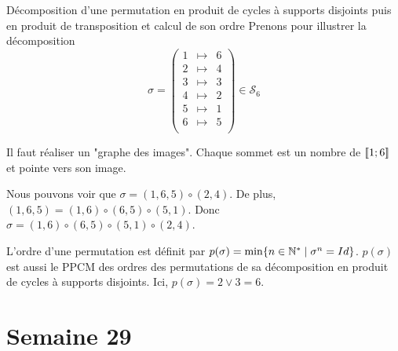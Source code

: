 \documentclass{article}
\renewenvironment{question_kholle}[2][ ]
{
	\subsection{\texorpdfstring{#2}{}}
	\notblank{#1}
	{
		\noindent #1
		\bigbreak
	}
	{}
	\begin{proof}
}
{
	\end{proof}
}
\begin{document}
\begin{question_kholle}
  {Décomposition d'une permutation en produit de cycles à supports disjoints puis en produit de transposition et calcul de son ordre}
  Prenons pour illustrer la décomposition
  \begin{equation*}
    \sigma = \begin{pmatrix}
      1 & \mapsto & 6 \\
      2 & \mapsto & 4 \\
      3 & \mapsto & 3 \\
      4 & \mapsto & 2 \\
      5 & \mapsto & 1 \\
      6 & \mapsto & 5 \\
    \end{pmatrix}
    \in \mathcal{S}_6
  \end{equation*}

  Il faut réaliser un "graphe des images". Chaque sommet est un nombre de $[\![ 1; 6 ]\!]$ et pointe vers son image.

  \begin{figure}[H]
    \centering
  \end{figure}

  Nous pouvons voir que $\sigma = (1, 6, 5) \circ (2, 4)$.
  De plus, $(1, 6, 5) = (1, 6) \circ (6, 5) \circ (5, 1)$.
  Donc $\sigma = (1, 6) \circ (6, 5) \circ (5, 1) \circ (2, 4)$.

  L'ordre d'une permutation est définit par $p(\sigma) = \min \{ n \in \mathbb N^* \;|\; \sigma^n = Id \}$. $p(\sigma)$ est aussi le PPCM des ordres des permutations de sa décomposition en produit de cycles à supports disjoints. Ici, $p(\sigma) = 2 \vee 3 = 6$.
\end{question_kholle}
\pagebreak\section{Semaine 29}
\end{document}
